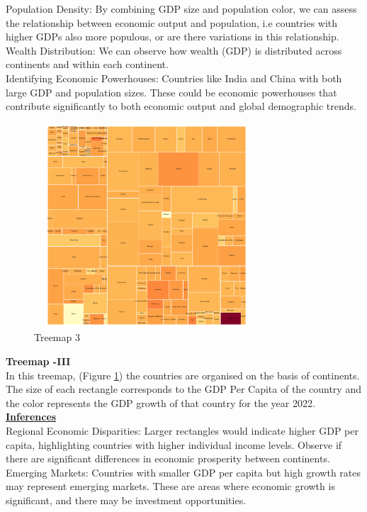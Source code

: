 \documentclass[conference]{IEEEtran}
\begin{document}
Population Density:  By combining GDP size and population color, we can assess the relationship between economic output and population, i.e  countries with higher GDPs also more populous, or are there variations in this relationship.\\
Wealth Distribution: We can observe how wealth (GDP) is distributed across continents and within each continent.\\
Identifying Economic Powerhouses: Countries like India and China with both large GDP and population sizes. These could be economic powerhouses that contribute significantly to both economic output and global demographic trends.\\
\begin{figure}
\centering
    \includegraphics[height=3in, width=0.75\textwidth]{images_ashish/treemap3.png}
    \caption{Treemap 3}
    \label{fig_3}
\end{figure}
\textbf{Treemap -III}\\
In this treemap, (Figure \ref{fig_3}) the countries are organised on the basis of continents. The size of each rectangle corresponds to the GDP Per Capita of the country and the color represents the GDP growth of that country for the year 2022.\\
\underline{\textbf{Inferences}}\\
Regional Economic Disparities: Larger rectangles would indicate higher GDP per capita, highlighting countries with higher individual income levels. Observe if there are significant differences in economic prosperity between continents.\\
Emerging Markets: Countries with smaller GDP per capita but high growth rates may represent emerging markets. These are areas where economic growth is significant, and there may be investment opportunities.\\
\end{document}
